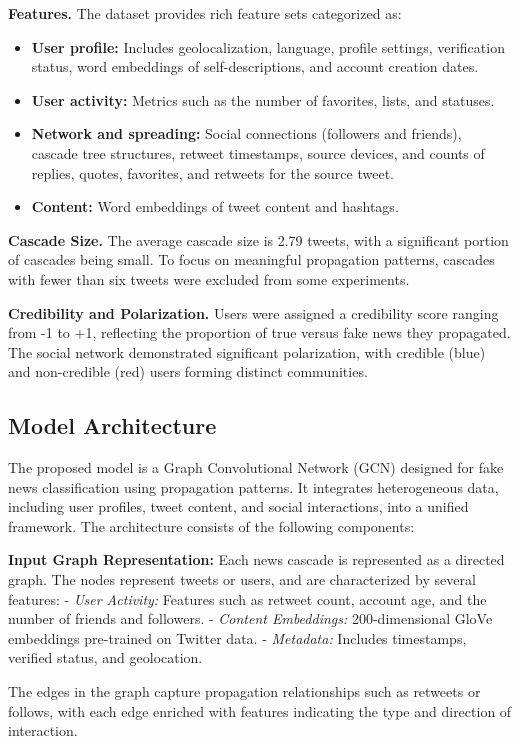\documentclass[sigconf,nonacm]{acmart}
\begin{document}
\textbf{Features.} The dataset provides rich feature sets categorized as: \begin{itemize} \item \textbf{User profile:} Includes geolocalization, language, profile settings, verification status, word embeddings of self-descriptions, and account creation dates. \item \textbf{User activity:} Metrics such as the number of favorites, lists, and statuses. \item \textbf{Network and spreading:} Social connections (followers and friends), cascade tree structures, retweet timestamps, source devices, and counts of replies, quotes, favorites, and retweets for the source tweet. \item \textbf{Content:} Word embeddings of tweet content and hashtags. \end{itemize}

\textbf{Cascade Size.} The average cascade size is 2.79 tweets, with a significant portion of cascades being small. To focus on meaningful propagation patterns, cascades with fewer than six tweets were excluded from some experiments.

\textbf{Credibility and Polarization.} Users were assigned a credibility score ranging from -1 to +1, reflecting the proportion of true versus fake news they propagated. The social network demonstrated significant polarization, with credible (blue) and non-credible (red) users forming distinct communities.
\subsection{Model Architecture}

The proposed model is a Graph Convolutional Network (GCN) designed for fake news classification using propagation patterns. It integrates heterogeneous data, including user profiles, tweet content, and social interactions, into a unified framework. The architecture consists of the following components:

\textbf{Input Graph Representation:}  
Each news cascade is represented as a directed graph. The nodes represent tweets or users, and are characterized by several features:
- \textit{User Activity:} Features such as retweet count, account age, and the number of friends and followers.
- \textit{Content Embeddings:} 200-dimensional GloVe embeddings pre-trained on Twitter data.
- \textit{Metadata:} Includes timestamps, verified status, and geolocation.

The edges in the graph capture propagation relationships such as retweets or follows, with each edge enriched with features indicating the type and direction of interaction.
\end{document}

